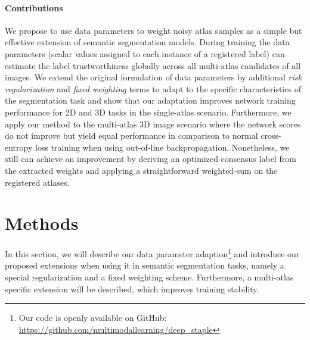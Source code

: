 \paragraph{\textbf{Contributions}}
\label{sec:contributions}
We propose to use data parameters \cite{saxena2019data} to weight noisy atlas samples as a simple but effective extension of semantic segmentation models. During training the data parameters (scalar values assigned to each instance of a registered label) can estimate the label trustworthiness globally across all multi-atlas candidates of all images.
We extend the original formulation of data parameters by additional \emph{risk regularization} and \emph{fixed weighting} terms to adapt to the specific characteristics of the segmentation task and show that our adaptation improves network training performance for 2D and 3D tasks in the single-atlas scenario.
Furthermore, we apply our method to the multi-atlas 3D image scenario where the network scores do not improve but yield equal performance in comparison to normal cross-entropy loss training when using {out-of-line backpropagation}.
Nonetheless, we still can achieve an improvement by deriving an optimized consensus label from the extracted weights and applying a straightforward weighted-sum on the registered atlases.

\section{Methods}
\label{sec:method_deepstaple}
    In this section, we will describe our data parameter adaption\footnote{Our code is openly available on GitHub: \url{https://github.com/multimodallearning/deep_staple}} and introduce our proposed extensions when using it in semantic segmentation tasks, namely a special regularization and a fixed weighting scheme. Furthermore, a multi-atlas specific extension will be described, which improves training stability.
